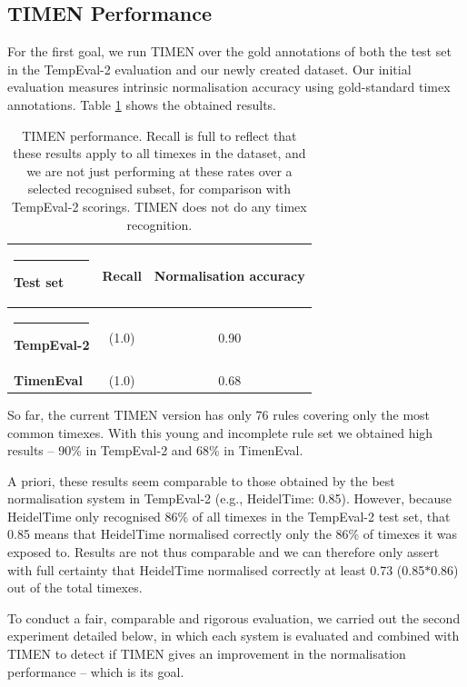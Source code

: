 \documentclass[10pt, a4paper]{article}
\begin{document}
\subsection{TIMEN Performance}

For the first goal, we run TIMEN over the gold annotations of both the test set in the TempEval-2 evaluation and our newly created dataset.
Our initial evaluation measures intrinsic normalisation accuracy using gold-standard timex annotations.
Table \ref{tab:TIMEN} shows the obtained results.

\begin{table} [htb]
\begin{footnotesize}
\begin{center}
\begin{tabular} {lcc}
  \hline\rule{-2pt}{8pt}
  {\bf Test set} &  {\bf Recall} &{\bf Normalisation accuracy}\\
  \hline\rule{-2pt}{8pt}
  {\bf TempEval-2}  	& (1.0)	& 0.90\\
  {\bf TimenEval}	& (1.0)	& 0.68\\
  \hline
\end{tabular}
\caption{TIMEN performance. Recall is full to reflect that these results apply to all timexes in the dataset, and we are not just performing at these rates over a selected recognised subset, for comparison with TempEval-2 scorings. TIMEN does not do any timex recognition.} 
\label{tab:TIMEN}
\end{center}
\end{footnotesize}
\end{table}

So far, the current TIMEN version has only 76 rules covering only the most common timexes.
With this young and incomplete rule set we obtained high results -- 90\% in TempEval-2 and 68\% in TimenEval.

A priori, these results seem comparable to those obtained by the best normalisation system in TempEval-2 (e.g., HeidelTime: 0.85).
However, because HeidelTime only recognised 86\% of all timexes in the TempEval-2 test set, that 0.85 means that HeidelTime normalised correctly only the 86\% of timexes it was exposed to.
Results are not thus comparable and we can therefore only assert with full certainty that HeidelTime normalised correctly at least 0.73 (0.85$*$0.86) out of the total timexes.

To conduct a fair, comparable and rigorous evaluation, we carried out the second experiment detailed below, in which each system is evaluated and combined with TIMEN to detect if TIMEN gives an improvement in the normalisation performance -- which is its goal.
\end{document}
